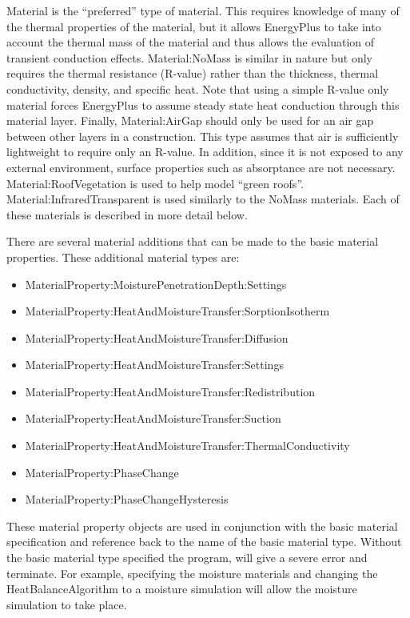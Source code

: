 Material is the ``preferred'' type of material. This requires knowledge of many of the thermal properties of the material, but it allows EnergyPlus to take into account the thermal mass of the material and thus allows the evaluation of transient conduction effects. Material:NoMass is similar in nature but only requires the thermal resistance (R-value) rather than the thickness, thermal conductivity, density, and specific heat. Note that using a simple R-value only material forces EnergyPlus to assume steady state heat conduction through this material layer. Finally, Material:AirGap should only be used for an air gap between other layers in a construction. This type assumes that air is sufficiently lightweight to require only an R-value. In addition, since it is not exposed to any external environment, surface properties such as absorptance are not necessary. Material:RoofVegetation is used to help model ``green roofs''. Material:InfraredTransparent is used similarly to the NoMass materials. Each of these materials is described in more detail below.

There are several material additions that can be made to the basic material properties. These additional material types are:

\begin{itemize}
\item
  MaterialProperty:MoisturePenetrationDepth:Settings
\item
  MaterialProperty:HeatAndMoistureTransfer:SorptionIsotherm
\item
  MaterialProperty:HeatAndMoistureTransfer:Diffusion
\item
  MaterialProperty:HeatAndMoistureTransfer:Settings
\item
  MaterialProperty:HeatAndMoistureTransfer:Redistribution
\item
  MaterialProperty:HeatAndMoistureTransfer:Suction
\item
  MaterialProperty:HeatAndMoistureTransfer:ThermalConductivity
\item
  MaterialProperty:PhaseChange
\item
  MaterialProperty:PhaseChangeHysteresis
\end{itemize}

These material property objects are used in conjunction with the basic material specification and reference back to the name of the basic material type. Without the basic material type specified the program, will give a severe error and terminate. For example, specifying the moisture materials and changing the HeatBalanceAlgorithm to a moisture simulation will allow the moisture simulation to take place.

